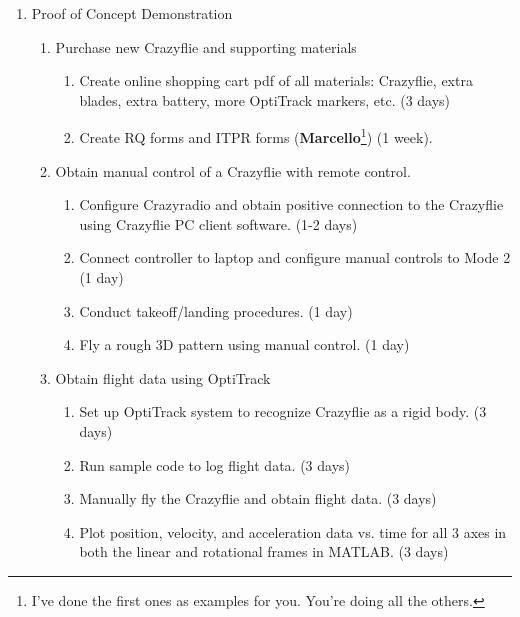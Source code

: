 \documentclass[onecolumn,10pt]{IEEEtran}
\newcommand{\MATLAB}{MATLAB}
\begin{document}
\begin{enumerate}
\item Proof of Concept Demonstration
\begin{enumerate}
\item Purchase new Crazyflie and supporting materials
\begin{enumerate}
\item Create online shopping cart pdf of all materials: Crazyflie, extra blades, extra battery, more OptiTrack markers, etc. (3 days)
\item Create RQ forms and ITPR forms (\textbf{Marcello}\footnote{I've done the first ones as examples for you. You're doing all the others.}) (1 week).
\end{enumerate}

\item Obtain manual control of a Crazyflie with remote control.
\begin{enumerate}
\item Configure Crazyradio and obtain positive connection to the Crazyflie using Crazyflie PC client software. (1-2 days)
\item Connect controller to laptop and configure manual controls to Mode 2 (1 day)
\item Conduct takeoff/landing procedures. (1 day)
\item Fly a rough 3D pattern using manual control. (1 day)
\end{enumerate}

\item Obtain flight data using OptiTrack
\begin{enumerate}
\item Set up OptiTrack system to recognize Crazyflie as a rigid body. (3 days)
\item Run sample code to log flight data. (3 days)
\item Manually fly the Crazyflie and obtain flight data. (3 days)
\item Plot position, velocity, and acceleration data vs. time for all 3 axes in both the linear and rotational frames in \MATLAB. (3 days)
\end{enumerate}


\end{enumerate}
\end{enumerate}
\end{document}
